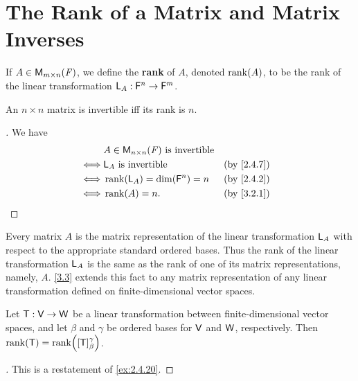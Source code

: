 \section{The Rank of a Matrix and Matrix Inverses}\label{sec:3.2}

\begin{defn}\label{3.2.1}
	If \(A \in \mathsf{M}_{{m} \times n}({\mathit{F}})\), we define the \textbf{rank} of \(A\), denoted \(\rk{A}\), to be the rank of the linear transformation \(\mathsf{L}_A : \mathsf{F}^n \to \mathsf{F}^m\).
\end{defn}

\begin{cor}\label{3.2.2}
	An \(n \times n\) matrix is invertible iff its rank is \(n\).
\end{cor}

\begin{proof}[]
	We have
	\begin{align*}
		     & A \in \ms{n}{n}{\F} \text{ is invertible}                 \\
		\iff & \L_A \text{ is invertible}                &  & \by{2.4.7} \\
		\iff & \rk{\L_A} = \dim(\vs{F}^n) = n            &  & \by{2.4.2} \\
		\iff & \rk{A} = n.                               &  & \by{3.2.1}
	\end{align*}
\end{proof}

\begin{note}
	Every matrix \(A\) is the matrix representation of the linear transformation \(\mathsf{L}_A\) with respect to the appropriate standard ordered bases.
	Thus the rank of the linear transformation \(\mathsf{L}_A\) is the same as the rank of one of its matrix representations, namely, \(A\).
	\cref{3.3} extends this fact to any matrix representation of any linear transformation defined on finite-dimensional vector spaces.
\end{note}

\begin{thm}\label{3.3}
	Let \(\mathsf{T} : \mathsf{V} \to \mathsf{W}\) be a linear transformation between finite-dimensional vector spaces, and let \(\beta\) and \(\gamma\) be ordered bases for \(\mathsf{V}\) and \(\mathsf{W}\), respectively.
	Then \(\rk{\T} = \rk{[\T]_{\beta}^{\gamma}}\).
\end{thm}

\begin{proof}[]
	This is a restatement of \cref{ex:2.4.20}.
\end{proof}

